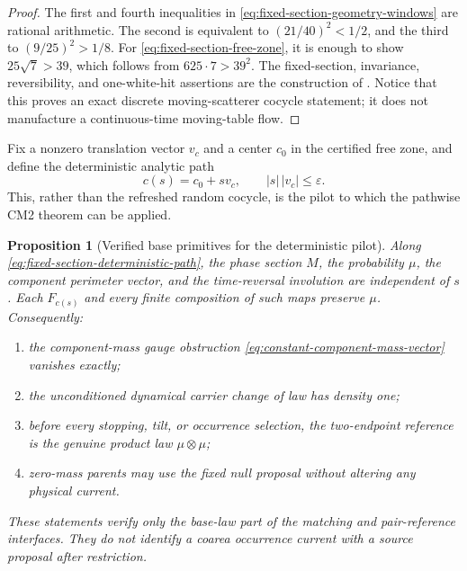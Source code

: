 \documentclass[11pt]{article}
\newtheorem{proposition}[theorem]{Proposition}
\begin{document}
\begin{proof}
The first and fourth inequalities in
\eqref{eq:fixed-section-geometry-windows} are rational arithmetic.  The
second is equivalent to $(21/40)^2<1/2$, and the third to
$(9/25)^2>1/8$.  For \eqref{eq:fixed-section-free-zone}, it is enough to
show $25\sqrt7>39$, which follows from $625\cdot7>39^2$.  The fixed-section,
invariance, reversibility, and one-white-hit assertions are the construction
of \cite[Sections~2.1--2.4]{StenlundRandom}.  Notice that this proves an
exact discrete moving-scatterer cocycle statement; it does not manufacture
a continuous-time moving-table flow.
\end{proof}

Fix a nonzero translation vector $v_c$ and a center $c_0$ in the certified
free zone, and define the deterministic analytic path
\begin{equation}
 c(s)=c_0+sv_c,\qquad |s|\,|v_c|\le\varepsilon.
\label{eq:fixed-section-deterministic-path}
\end{equation}
This, rather than the refreshed random cocycle, is the pilot to which the
pathwise CM2 theorem can be applied.

\begin{proposition}[Verified base primitives for the deterministic pilot]
\label{prop:fixed-section-verified-primitives}
Along \eqref{eq:fixed-section-deterministic-path}, the phase section $M$,
the probability $\mu$, the component perimeter vector, and the time-reversal
involution are independent of $s$.  Each $F_{c(s)}$ and every finite
composition of such maps preserve $\mu$.  Consequently:
\begin{enumerate}[label=\textup{(V\arabic*)}]
\item the component-mass gauge obstruction
      \eqref{eq:constant-component-mass-vector} vanishes exactly;
\item the unconditioned dynamical carrier change of law has density one;
\item before every stopping, tilt, or occurrence selection, the two-endpoint
      reference is the genuine product law $\mu\otimes\mu$;
\item zero-mass parents may use the fixed null proposal without altering any
      physical current.
\end{enumerate}
These statements verify only the base-law part of the matching and
pair-reference interfaces.  They do not identify a coarea occurrence current
with a source proposal after restriction.
\end{proposition}
\end{document}
